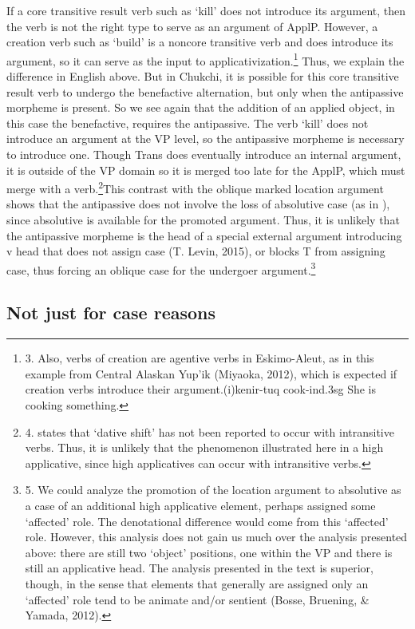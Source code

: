 \documentclass[output=paper,modfonts,nonflat]{langsci/langscibook}
\begin{document}
If a core transitive result verb such as ‘kill’ does not introduce its argument, then the verb is not the right type to serve as an argument of ApplP.  However, a creation verb such as ‘build’ is a noncore transitive verb and does introduce its argument, so it can serve as the input to applicativization.\footnote{3.  Also, verbs of creation are agentive verbs in Eskimo-Aleut, as in this example from Central Alaskan Yup’ik (Miyaoka, 2012), which is expected if creation verbs introduce their argument.(i)kenir-tuq      cook-\textrm{ind}.3\textrm{sg} She is cooking something.}  Thus, we explain the difference in English above.  But in Chukchi, it is possible for this core transitive result verb to undergo the benefactive alternation, but only when the antipassive morpheme is present.  So we see again that the addition of an applied object, in this case the benefactive, requires the antipassive.  The verb ‘kill’ does not introduce an argument at the VP level, so the antipassive morpheme is necessary to introduce one.  Though Trans does eventually introduce an internal argument, it is outside of the VP domain so it is merged too late for the ApplP, which must merge with a verb.\footnote{4.  \citet{Spencer1995} states that ‘dative shift’ has not been reported to occur with intransitive verbs.  Thus, it is unlikely that the phenomenon illustrated here in a high applicative, since high applicatives can occur with intransitive verbs.}This contrast with the oblique marked location argument shows that the antipassive does not involve the loss of absolutive case (as in \citealt{Baker1988}), since absolutive is available for the promoted argument.  Thus, it is unlikely that the antipassive morpheme is the head of a special external argument introducing v head that does not assign case (T. Levin, 2015), or blocks T from assigning case, thus forcing an oblique case for the undergoer argument.\footnote{5.  We could analyze the promotion of the location argument to absolutive as a case of an additional high applicative element, perhaps assigned some ‘affected’ role.   The denotational difference would come from this ‘affected’ role. However, this analysis does not gain us much over the analysis presented above: there are still two ‘object’ positions, one within the VP and there is still an applicative head.  The analysis presented in the text is superior, though, in the sense that elements that generally are assigned only an ‘affected’ role tend to be animate and/or sentient (Bosse, Bruening, \& Yamada, 2012).} 

\subsection{Not just for case reasons} %
\end{document}
